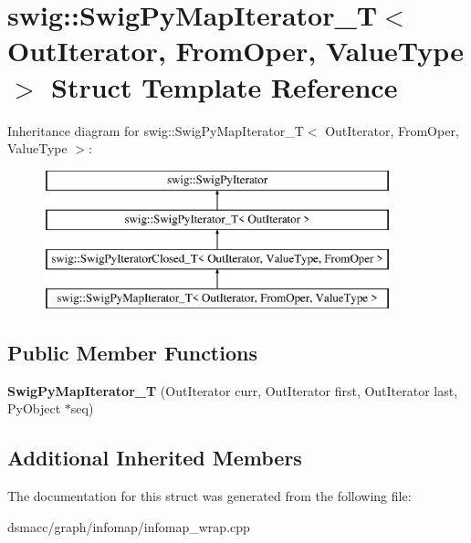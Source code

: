 \hypertarget{structswig_1_1SwigPyMapIterator__T}{}\section{swig\+:\+:Swig\+Py\+Map\+Iterator\+\_\+T$<$ Out\+Iterator, From\+Oper, Value\+Type $>$ Struct Template Reference}
\label{structswig_1_1SwigPyMapIterator__T}
Inheritance diagram for swig\+:\+:Swig\+Py\+Map\+Iterator\+\_\+T$<$ Out\+Iterator, From\+Oper, Value\+Type $>$\+:\begin{figure}[H]
\begin{center}
\leavevmode
\includegraphics[height=4.000000cm]{structswig_1_1SwigPyMapIterator__T}
\end{center}
\end{figure}
\subsection*{Public Member Functions}
\begin{DoxyCompactItemize}
\item 
\mbox{\label{structswig_1_1SwigPyMapIterator__T_af93da33a7a2ad14b70e2ed9f1bcd7ea9}} 
{\bfseries Swig\+Py\+Map\+Iterator\+\_\+T} (Out\+Iterator curr, Out\+Iterator first, Out\+Iterator last, Py\+Object $\ast$seq)
\end{DoxyCompactItemize}
\subsection*{Additional Inherited Members}


The documentation for this struct was generated from the following file\+:\begin{DoxyCompactItemize}
\item 
dsmacc/graph/infomap/infomap\+\_\+wrap.\+cpp\end{DoxyCompactItemize}
